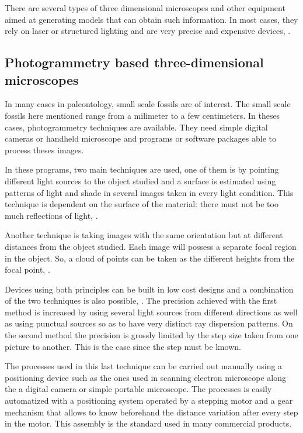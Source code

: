 \documentclass[journal]{IEEEtran}
\begin{document}
There are several types of three dimensional microscopes and other equipment aimed at generating models that can obtain such information. In most cases, they rely on laser or structured lighting and are very precise and expensive devices, \cite{Remondino2012,Rawat2017}.


\subsection{Photogrammetry based three-dimensional microscopes}

In many cases in paleontology, small scale fossils are of interest. The small scale fossils here mentioned range from a milimeter to a few centimeters. In theses cases, photogrammetry techniques are available. They need simple digital cameras or handheld microscope and programs or software packages able to process theses images. 

In these programs, two main techniques are used, one of them is by pointing different light sources to the object studied and a surface is estimated using patterns of light and shade in several images taken in every light condition. This technique is dependent on the surface of the material: there must not be too much reflections of light, \cite{Queau2015,Saracchini2013}.

Another technique is taking images with the same orientation but at different distances from the object studied. Each image will possess a separate focal region in the object. So, a cloud of points can be taken as the different heights from the focal point, \cite{Saracchini2012,Saracchini2011}.

Devices using both principles can be built in low cost designs and a combination of the two techniques is also possible, \cite{Wijnen2016,Schneidereit2017,Lelis2017,Schaefer2012,Cavas-martinez2019,Campbell2014}. The precision achieved with the first method is increased by using several light sources from different directions as well as using punctual sources so as to have very distinct ray dispersion patterns. On the second method the precision is grossly limited by the step size taken from one picture to another. This is the case since the step must be known.

The processes used in this last technique can be carried out manually using a positioning device such as the ones used in scanning electron microscope along the a digital camera or simple portable microscope. The processes is easily automatized with a positioning system operated by a stepping motor and a gear mechanism that allows to know beforehand the distance variation after every step in the motor. This assembly is the standard used in many commercial products.
\end{document}
